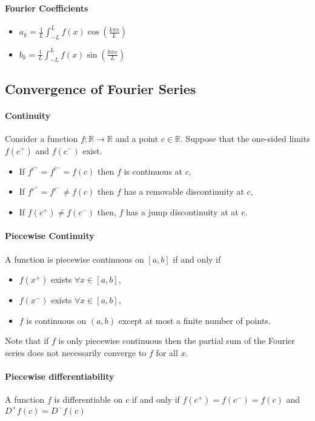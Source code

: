 \paragraph{Fourier Coefficients}
\begin{itemize}
    \item \(a_k = \frac{1}{L} \int_{-L}^{L} f(x) \cos\left( \frac{k\pi x}{L} \right)\)
    \item \(b_k = \frac{1}{L} \int_{-L}^{L} f(x) \sin\left( \frac{k\pi x}{L} \right)\)
\end{itemize}

\subsection{Convergence of Fourier Series}
\paragraph{Continuity}
Consider a function \(f: \mathbb{R}\to \mathbb{R}\) and a point \(c\in \mathbb{R}\).
Suppose that the one-sided limits \(f(c^+)\) and \(f(c^-)\) exist.

\begin{itemize}
    \item If \(f^{c^+} = f^{c^-} = f(c)\) then \(f\) is continuous at \(c\),
    \item If \(f^{c^+} = f^{c^-} \neq f(c)\) then \(f\) has a removable discontinuity at \(c\),
    \item If \(f(c^+) \neq f(c^-)\) then, \(f\) has a jump discontinuity at
    at c.
\end{itemize}

\paragraph{Piecewise Continuity}
A function is piecewise continuous on \([a, b]\) if and only if 
\begin{itemize}
    \item \(f(x^+)\) exists \(\forall x\in [a, b]\),
    \item \(f(x^-)\) exists \(\forall x\in [a, b]\),
    \item \(f\) is continuous on \((a, b)\) except at most a finite number of points.
\end{itemize}
Note that if \(f\) is only piecewise continuous then the partial sum of the Fourier series does not necessarily converge to \(f\) for all \(x\).

\paragraph{Piecewise differentiability}
A function \(f\) is differentiable on \(c\) if and only if
\(f(c^+) = f(c^-) = f(c)\) and \(D^+ f(c) = D^- f(c)\)

